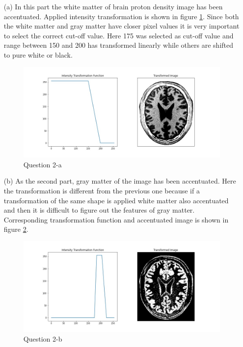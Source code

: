 \documentclass[11pt]{article}
\begin{document}
\begin{itemize}
    \item[(a)] In this part the white matter of brain proton density image has been accentuated. Applied intensity transformation is
               shown in figure \ref{Question 2-a}. Since both the white matter and gray matter \cite{brain} have closer pixel values it is very important 
               to select the correct cut-off value. Here 175 was selected as cut-off value and range between 150 and 200 has transformed 
               linearly while others are shifted to pure white or black.

                \begin{figure}[!h]
                    \centering
                    \includegraphics[width=\textwidth]{Images/2a.jpg}
                    \caption{Question 2-a}
                    \label{Question 2-a}
                \end{figure} 
    
    \item[(b)]  As the second part, gray matter of the image has been accentuated. Here the transformation is different from the previous one because
                if a transformation of the same shape is applied white matter also accentuated and then it is difficult to figure out the features of 
                gray matter. Corresponding transformation function and accentuated image is shown in figure \ref{Question 2-b}.

                \begin{figure}[!h]
                    \centering
                    \includegraphics[width=\textwidth]{Images/2b.jpg}
                    \caption{Question 2-b}
                    \label{Question 2-b}
                \end{figure} 
\end{itemize}
\end{document}
